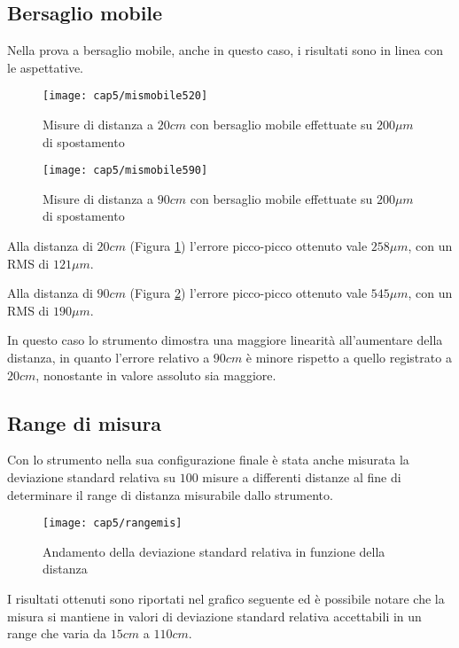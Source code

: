 \subsection{Bersaglio mobile}
Nella prova a bersaglio mobile, anche in questo caso, i risultati sono in linea con le aspettative. 
\begin{figure}  
  \begin{center}
    \texttt{[image: cap5/mismobile520]}
    \caption{Misure di distanza a $20cm$ con bersaglio mobile effettuate su $200 \mu m$ di spostamento}
    \label{mismobile520}
  \end{center}
\end{figure}

\begin{figure}  
  \begin{center}
    \texttt{[image: cap5/mismobile590]}
    \caption{Misure di distanza a $90cm$ con bersaglio mobile effettuate su $200 \mu m$ di spostamento}
    \label{mismobile590}
  \end{center}
\end{figure}

Alla distanza di $20cm$ (Figura \ref{mismobile520}) l'errore picco-picco ottenuto vale $258 \mu m$, con un RMS di $121 \mu m$.

Alla distanza di $90cm$ (Figura \ref{mismobile590}) l'errore picco-picco ottenuto vale $ 545 \mu m$, con un RMS di $ 190 \mu m$.

In questo caso lo strumento dimostra una maggiore linearità all'aumentare della distanza, in quanto l'errore relativo a $90cm$ è minore rispetto a quello registrato a $20cm$, nonostante in valore assoluto sia maggiore.

\subsection{Range di misura}
Con lo strumento nella sua configurazione finale è stata anche misurata la deviazione standard relativa su $100$ misure a differenti distanze al fine di determinare il range di distanza misurabile dallo strumento. 
\begin{figure}  
  \begin{center}
    \texttt{[image: cap5/rangemis]}
    \caption{Andamento della deviazione standard relativa in funzione della distanza}
    \label{rangemis}
  \end{center}
\end{figure}

I risultati ottenuti sono riportati nel grafico seguente ed è possibile notare che la misura si mantiene in valori di deviazione standard relativa accettabili in un range che varia da $15cm$ a $110cm$. 

